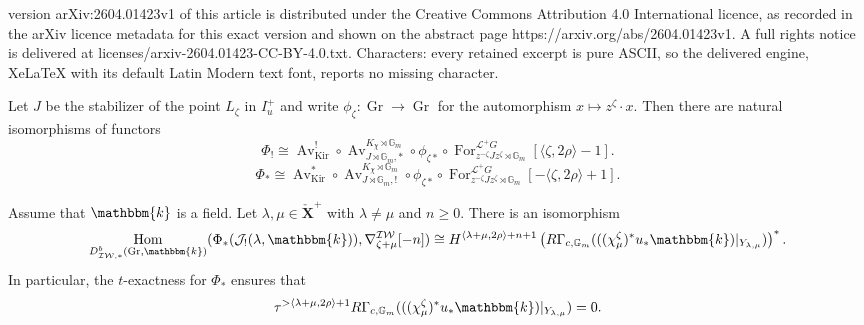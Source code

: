 \documentclass[10pt,a4paper]{amsart}
\DeclareMathOperator{\Av}{Av}
\DeclareMathOperator{\For}{For}
\newcommand{\G}{\mathbb{G}}
\DeclareMathOperator{\Gr}{Gr}
\DeclareMathOperator{\Hom}{Hom}
\newcommand{\IW}{\mathcal{IW}}
\DeclareMathOperator{\Kir}{Kir}
\renewcommand{\L}{\mathcal{L}}
\newcommand{\bfXv}{\check{\mathbf{X}}}
\renewcommand{\k}{\mathbbm{k}}
\newcommand{\scrJ}{\mathcal{J}}
\begin{document}
version arXiv:2604.01423v1 of this article is distributed under the Creative Commons Attribution 4.0 International licence, as recorded in the arXiv licence metadata for this exact version and shown on the abstract page https://arxiv.org/abs/2604.01423v1. A full rights notice is delivered at licenses/arxiv-2604.01423-CC-BY-4.0.txt. Characters: every retained excerpt is pure ASCII, so the delivered engine, XeLaTeX with its default Latin Modern text font, reports no missing character.
    \begin{lemma}\label{lem:desc_of_Phi}
        Let $J$ be the stabilizer of the point $L_{\zeta}$ in $I_u^+$ and write $\phi_{\zeta} : \Gr \to \Gr$ for the automorphism $x \mapsto z^{\zeta} \cdot x$.
        Then there are natural isomorphisms of functors
        \[\Phi_! \cong \Av_{\Kir}^! \circ \Av_{J \rtimes \G_m, *}^{K_{\chi} \rtimes \G_m} \circ \phi_{\zeta *} \circ \For^{\L^+ G}_{z^{-\zeta} J z^{\zeta} \rtimes \G_m} [\langle \zeta, 2\rho \rangle - 1].\]        
        \[\Phi_* \cong \Av_{\Kir}^* \circ \Av_{J \rtimes \G_m, !}^{K_{\chi} \rtimes \G_m} \circ \phi_{\zeta *} \circ \For^{\L^+ G}_{z^{-\zeta} J z^{\zeta} \rtimes \G_m} [-\langle \zeta, 2\rho \rangle + 1].\]        
    \end{lemma}

    \begin{lemma}\label{lem:hom_and_cohomology_std_costd}
        Assume that $\k$ is a field. Let $\lambda, \mu \in \bfXv^+$ with $\lambda \neq \mu$ and $n \geq 0$.
        There is an isomorphism
        \[\Hom_{D_{\IW, *}^b (\Gr, \k)} (\Phi_* (\scrJ_! (\lambda, \k)), \nabla_{\zeta + \mu}^{\IW} [-n]) \cong H^{\langle \lambda + \mu, 2\rho \rangle + n + 1} \left( R\Gamma_{c, \G_m} (((\chi_{\mu}^{\zeta})^* u_* \k)\vert_{Y_{\lambda, \mu}} )\right)^*.\]
        In particular, the $t$-exactness for $\Phi_*$ ensures that
        \[\tau^{> \langle \lambda + \mu, 2\rho \rangle + 1} R\Gamma_{c, \G_m} (((\chi_{\mu}^{\zeta})^* u_* \k)\vert_{Y_{\lambda, \mu}}) = 0.\]
    \end{lemma}
\end{document}

